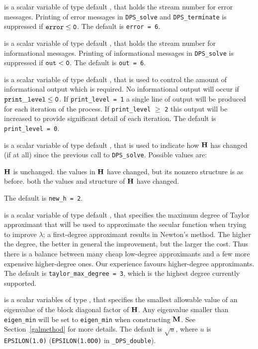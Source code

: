 \documentclass{galahad}
\newcommand{\packagename}{DPS}
\newcommand{\fullpackagename}{\libraryname\_\packagename}
\begin{document}
\begin{description}
 is a scalar variable of type default \integer, that holds the
stream number for error messages.
Printing of error messages in
{\tt \packagename\_solve} and {\tt \packagename\_terminate}
is suppressed if ${\tt error} \leq {\tt 0}$.
The default is {\tt error = 6}.

 is a scalar variable of type default \integer, that holds the
stream number for informational messages.
Printing of informational messages in
{\tt \packagename\_solve} is suppressed if ${\tt out} < {\tt 0}$.
The default is {\tt out = 6}.

 is a scalar variable of type default \integer,
that is used
to control the amount of informational output which is required. No
informational output will occur if ${\tt print\_level} \leq {\tt 0}$. If
{\tt print\_level = 1} a single line of output will be produced for each
iteration of the process. If {\tt print\_level} $\geq$ {\tt 2} this output
will be increased to provide significant detail of each iteration.
The default is {\tt print\_level = 0}.

 is a scalar variable of type default \integer, that is used
to indicate how ${\mathbf{H}}$ has changed (if at all) since the previous call
to {\tt \packagename\_solve}. Possible values are:
\begin{description}
 ${\mathbf{H}}$ is unchanged.
 the values in ${\mathbf{H}}$ have changed, but its nonzero structure
is as before.
 both the values and structure of ${\mathbf{H}}$ have changed.
\end{description}
The default is {\tt new\_h = 2}.

 is a scalar variable of type default \integer,
that specifies the maximum degree of Taylor approximant that will be used
to approximate the secular function when trying to improve $\lambda$;
a first-degree approximant results in Newton's method.
The higher the degree, the better in general the improvement, but the larger the
cost. Thus there is a balance between many cheap low-degree approximants
and a few more expensive higher-degree ones. Our experience favours
higher-degree approximants.
The default is {\tt taylor\_max\_degree = 3}, which is the highest degree
currently supported.

 is a scalar variables of type \realdp, that specifies the
smallest allowable value of an eigenvalue of the block diagonal factor of
${\mathbf{H}}$. Any eigenvalue smaller than {\tt eigen\_min}
will be set to {\tt eigen\_min} when constructing ${\mathbf{M}}$.
See Section~\ref{galmethod} for more details.
The default is $\sqrt{u}$, where $u$ is
{\tt EPSILON(1.0)} ({\tt EPSILON(1.0D0)} in {\tt \fullpackagename\_double}).


\end{description}
\end{document}
